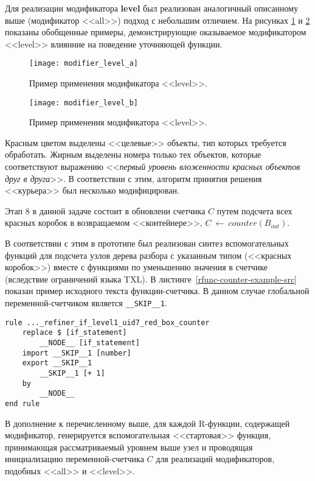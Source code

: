 Для реализации модификатора \textbf{level} был реализован аналогичный описанному выше (модификатор <<all>>) подход с небольшим отличием.
На рисунках \ref{fig:modifier_level_a} и \ref{fig:modifier_level_b} показаны обобщенные примеры, демонстрирующие оказываемое модификатором <<level>> влиянние на поведение уточняющей функции.
\begin{figure}[!h]
  \centering
  \texttt{[image: modifier\_level\_a]}
  \caption{Пример применения модификатора <<level>>.}
  \label{fig:modifier_level_a}
\end{figure}
\begin{figure}[!h]
  \centering
  \texttt{[image: modifier\_level\_b]}
  \caption{Пример применения модификатора <<level>>.}
  \label{fig:modifier_level_b}
\end{figure}
Красным цветом выделены <<целевые>> объекты, тип которых требуется обработать.
Жирным выделены номера только тех объектов, которые соответствуют выражению <<\textit{первый уровень вложенности красных объектов друг в друга}>>.
В соответствии с этим, алгоритм принятия решения <<курьера>> был несколько модифицирован.

Этап 8 в данной задаче состоит в обновлени счетчика $C$ путем подсчета всех красных коробок в возвращаемом <<контейнере>>, $C~\leftarrow~counter(B_{out})$.

В соответствии с этим в прототипе был реализован синтез вспомогательных функций для подсчета узлов дерева разбора с указанным типом (<<красных коробок>>) вместе с функциями по уменьшению значения в счетчике (вследствие ограничений языка TXL).
В листинге~\ref{rfunc-counter-example-src} показан пример исходного текста функции-счетчика.
В данном случае глобальной переменной-счетчиком является \lstinline{__SKIP__1}.

\begin{lstlisting}[frame=single, language=TXL, label={rfunc-counter-example-src}, caption={Пример синтезированной функции-счетчика.}]
rule ..._refiner_if_level1_uid7_red_box_counter
	replace $ [if_statement]
		__NODE__ [if_statement]
	import __SKIP__1 [number]
	export __SKIP__1
		__SKIP__1 [+ 1]
	by
		__NODE__
end rule
\end{lstlisting}

В дополнение к перечисленному выше, для каждой R-функции, содержащей модификатор, генерируется вспомогательная <<стартовая>> функция, принимающая рассматриваемый уровнем выше узел и проводящая инициализацию переменной-счетчика $C$ для реализаций модификаторов, подобных <<all>> и <<level>>.

